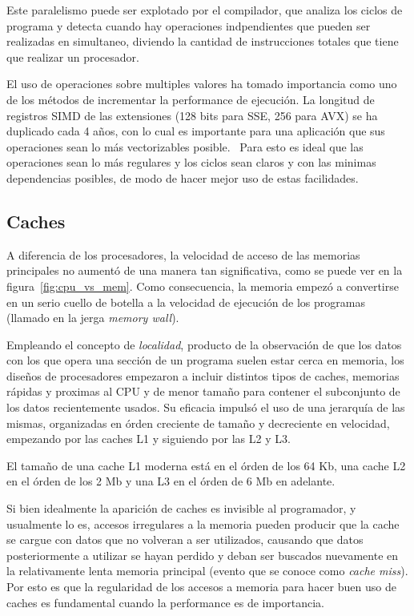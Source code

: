 Este paralelismo puede ser explotado por el compilador, que analiza los ciclos de programa y detecta cuando hay operaciones
indpendientes que pueden ser realizadas en simultaneo, diviendo la cantidad de instrucciones totales que tiene que realizar
un procesador.

El uso de operaciones sobre multiples valores ha tomado importancia como uno de los m\'etodos de incrementar
la performance de ejecuci\'on. La longitud de registros SIMD de las extensiones (128 bits para SSE, 256 para AVX)
se ha duplicado cada 4 a\~nos, con lo cual es importante para una aplicaci\'on que sus operaciones sean lo m\'as
vectorizables posible.~\cite{HennessyPatterson} Para esto es ideal que las operaciones sean lo m\'as regulares y
los ciclos sean claros y con las minimas dependencias posibles, de modo de hacer mejor uso de estas facilidades.

\subsection{Caches}

A diferencia de los procesadores, la velocidad de acceso de las memorias principales no aument\'o de una manera
tan significativa, como se puede ver en la figura~\ref{fig:cpu_vs_mem}. Como consecuencia, la memoria
empez\'o a convertirse en un serio cuello de botella a la velocidad de ejecuci\'on de los programas (llamado
en la jerga \textit{memory wall}).

Empleando el concepto de \textit{localidad}, producto de la observaci\'on de que los datos con los que opera una
secci\'on de un programa suelen estar cerca en memoria, los dise\~nos de procesadores empezaron a incluir distintos
tipos de caches, memorias r\'apidas y proximas al CPU y de menor tama\~no para contener el subconjunto de los datos
recientemente usados. Su eficacia impuls\'o el uso de una jerarqu\'ia de las mismas, organizadas en \'orden creciente
de tama\~no y decreciente en velocidad, empezando por las caches L1 y siguiendo por las L2 y L3.

El tama\~no de una cache L1 moderna est\'a en el \'orden de los 64 Kb, una cache L2 en el \'orden de los 2 Mb y
una L3 en el \'orden de 6 Mb en adelante.

Si bien idealmente la aparici\'on de caches es invisible al programador, y usualmente lo es, accesos irregulares a la
memoria pueden producir que la cache se cargue con datos que no volveran a ser utilizados, causando que datos posteriormente
a utilizar se hayan perdido y deban ser buscados nuevamente en la relativamente lenta memoria principal (evento que se conoce como
\textit{cache miss}). Por esto es que la regularidad de los accesos a memoria para hacer buen uso de caches es
fundamental cuando la performance es de importancia.

